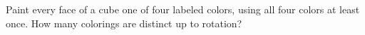 Paint every face of a cube one of four labeled colors, using all four colors at least once. How many colorings are distinct up to rotation?
